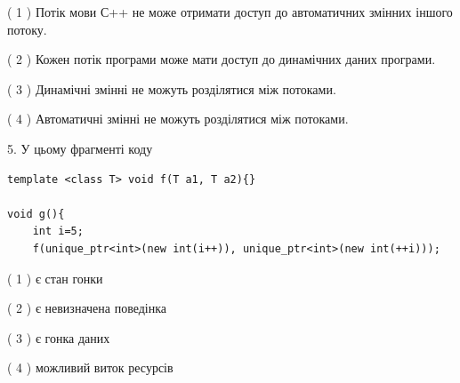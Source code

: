 \documentclass[12pt, ukrainian]{article}
\begin{document}
\begin {large}
{( 1 ) Потік мови С++ не може отримати доступ до автоматичних змінних іншого потоку.%

( 2 ) Кожен потік програми може мати доступ до динамічних даних програми.%

( 3 ) Динамічні змінні не можуть розділятися між потоками.%

( 4 ) Автоматичні змінні не можуть розділятися між потоками.%


5. У цьому фрагменті коду
\begin{verbatim}
template <class T> void f(T a1, T a2){}

void g(){
    int i=5;
    f(unique_ptr<int>(new int(i++)), unique_ptr<int>(new int(++i)));
\end{verbatim}

( 1 ) є стан гонки%

( 2 ) є невизначена поведінка%

( 3 ) є гонка даних%

( 4 ) можливий виток ресурсів%
}
\end {large}
\end{document}
